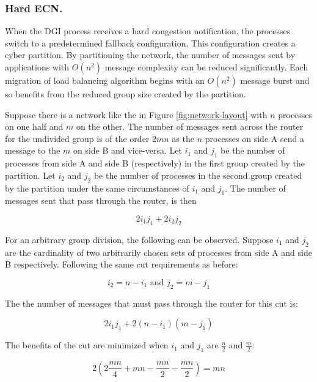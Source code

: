 \subsubsection{Hard \ac{ECN}.}

When the \ac{DGI} process receives a hard congestion notification, the processes switch to a predetermined fallback configuration.
This configuration creates a cyber partition.
By partitioning the network, the number of messages sent by applications with $O(n^2)$ message complexity can be reduced significantly.
Each migration of load balancing algorithm begins with an $O(n^2)$ message burst and so benefits from the reduced group size created by the partition.

Suppose there is a network like the in Figure \ref{fig:network-layout} with $n$ processes on one half and $m$ on the other.
The number of messages sent across the router for the undivided group is of the order $2mn$ as the $n$ processes on side A send a message to the $m$ on side B and vice-versa.
Let $i_{1}$ and $j_{1}$ be the number of processes from side A and side B (respectively) in the first group created by the partition.
Let $i_{2}$ and $j_{2}$ be the number of processes in the second group created by the partition under the same circumstances of $i_1$ and $j_1$.
The number of messages sent that pass through the router, is then 

\begin{equation}
2 i_{1} j_{1} + 2 i_{2} j_{2}
\end{equation}

For an arbitrary group division, the following can be observed.
Suppose $i_{1}$ and $j_{2}$ are the cardinality of two arbitrarily chosen sets of processes from side A and side B respectively.
Following the same cut requirements as before:

\begin{equation}
i_2 = n - i_1 \text{ and } j_2 = m - j_1
\end{equation}

The the number of messages that must pass through the router for this cut is:

\begin{equation}
2 i_{1} j_{1} + 2 (n-i_{1}) (m-j_{1})
\end{equation}

The benefits of the cut are minimized when $i_1$ and $j_1$ are $\frac{n}{2}$ and $\frac{m}{2}$:

\begin{equation}
2( 2 \frac{mn}{4} + mn - \frac{mn}{2} - \frac{mn}{2}) = mn
\end{equation}

